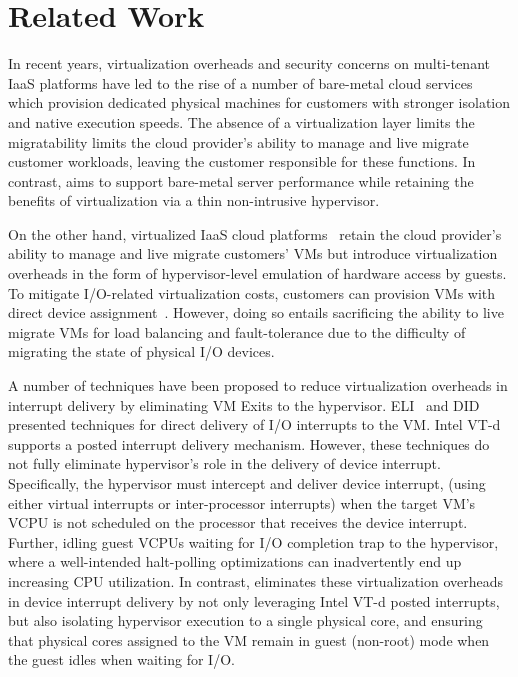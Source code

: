 
\section{Related Work}
In recent years, virtualization overheads and security concerns on 
multi-tenant IaaS platforms have led to the rise of a 
number of bare-metal cloud 
services~\cite{softlayer,oracle,zenlayer,vultr,m2}
which provision dedicated physical machines for customers
with stronger isolation and native execution speeds.
The absence of a virtualization layer limits the migratability 
limits the cloud provider's ability to manage and live migrate
customer workloads, leaving the customer responsible for 
these functions.
In contrast, \na aims to support bare-metal server performance
while retaining the benefits of virtualization via a 
thin non-intrusive hypervisor.

On the other hand, virtualized IaaS cloud platforms~\cite{gcp,azure,aws}
retain the cloud provider's ability to manage and live migrate customers'
VMs but introduce virtualization overheads in the form of hypervisor-level
emulation of hardware access by guests. To mitigate I/O-related 
virtualization costs, customers can provision VMs with 
direct device assignment~\cite{vtd}. 
However, doing so entails sacrificing the ability 
to live migrate VMs for load balancing and fault-tolerance
due to the difficulty of migrating the state of physical I/O devices.

A number of techniques have been proposed to reduce virtualization
overheads in interrupt delivery by eliminating VM Exits to the hypervisor.
ELI~\cite{amit:2015} and DID~\cite{tu:2015} presented techniques
for direct delivery of I/O interrupts to the VM. 
Intel VT-d~\cite{vtd} supports a posted interrupt delivery mechanism.
However, these techniques do not fully eliminate hypervisor's role
in the delivery of device interrupt.
Specifically, the hypervisor must intercept and deliver device interrupt,
(using either virtual interrupts or inter-processor interrupts)
when the target VM's VCPU is not scheduled on the processor 
that receives the device interrupt. Further, idling guest VCPUs
waiting for I/O completion trap to the hypervisor, where a well-intended
halt-polling optimizations can inadvertently end up increasing CPU utilization.
In contrast, \na eliminates these virtualization
overheads in device interrupt delivery by not only leveraging
Intel VT-d posted interrupts, but also isolating  hypervisor execution 
to a single physical core, and ensuring that physical 
cores assigned to the VM remain in guest (non-root) 
mode when the guest idles when waiting for I/O.

